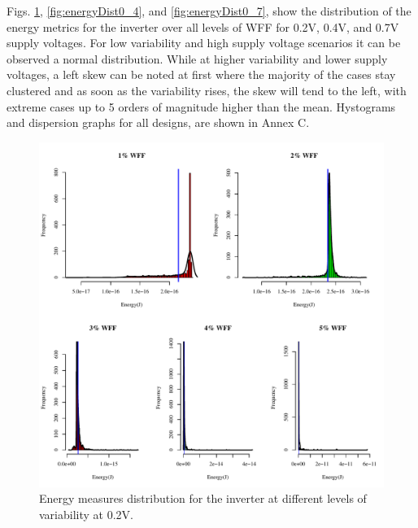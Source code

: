 \documentclass[pgmicro,mestrado,english]{iiufrgs}
\begin{document}
    Figs. \ref{fig:energyDist0_2}, \ref{fig:energyDist0_4}, and \ref{fig:energyDist0_7}, show the distribution of the energy metrics for the inverter over all levels of WFF for 0.2V, 0.4V, and 0.7V supply voltages. For low variability and high supply voltage scenarios it can be observed a normal distribution. While at higher variability and lower supply voltages, a left skew can be noted at first where the majority of the cases stay clustered and as soon as the variability rises, the skew will tend to the left, with extreme cases up to 5 orders of magnitude higher than the mean. Hystograms and dispersion graphs for all designs, are shown in Annex C.
    
     \begin{figure}[]
        \centering
            \includegraphics[width=1\textwidth, trim={0cm 0cm 0cm 0cm}, clip]{dist_energy_INV_0_2.pdf}
            \caption{Energy measures distribution for the inverter at different levels of variability at 0.2V.}
        \label{fig:energyDist0_2}
    \end{figure}   
    
\end{document}
